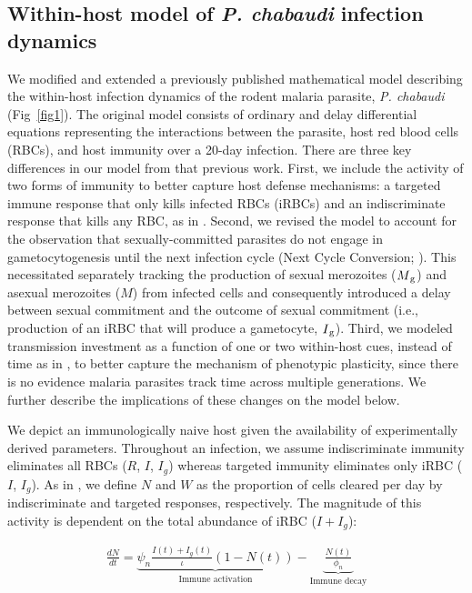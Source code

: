 \documentclass[10pt,letterpaper]{article}
\begin{document}
\subsection*{Within-host model of \emph{P. chabaudi} infection dynamics}
We modified and extended a previously published mathematical model describing the within-host infection dynamics of the rodent malaria parasite, \emph{P. chabaudi} \cite{greischar_predicting_2016} (Fig~\ref{fig1}). The original model consists of ordinary and delay differential equations representing the interactions between the parasite, host red blood cells (RBCs), and host immunity over a 20-day infection. There are three key differences in our model from that previous work. First, we include the activity of two forms of immunity to better capture host defense mechanisms: a targeted immune response that only kills infected RBCs (iRBCs) and an indiscriminate response that kills any RBC, as in \cite{kamiya_uncovering_2020}. Second, we revised the model to account for the observation that sexually-committed parasites do not engage in gametocytogenesis until the next infection cycle (Next Cycle Conversion; \cite{dixon_sex_2008}). This necessitated separately tracking the production of sexual merozoites ($M\textsubscript{g}$) and asexual merozoites ($M$) from infected cells and consequently introduced a delay between sexual commitment and the outcome of sexual commitment (i.e., production of an iRBC that will produce a gametocyte, $I\textsubscript{g}$). Third, we modeled transmission investment as a function of one or two within-host cues, instead of time as in \cite{greischar_predicting_2016}, to better capture the mechanism of phenotypic plasticity, since there is no evidence malaria parasites track time across multiple generations. We further describe the implications of these changes on the model below.\newline

We depict an immunologically naive host given the availability of experimentally derived parameters. Throughout an infection, we assume indiscriminate immunity eliminates all RBCs ($R$, $I$, $I_g$) whereas targeted immunity eliminates only iRBC ($I$, $I_g$). As in \cite{kamiya_uncovering_2020}, we define $N$ and $W$ as the proportion of cells cleared per day by indiscriminate and targeted responses, respectively. The magnitude of this activity is dependent on the total abundance of iRBC ($I+I_g$):

\begin{eqnarray}
\label{eq:scheme13}
    \frac{dN}{dt}=\underbrace{\psi_{n}\frac{I(t)+I_{g}(t)}{\iota}(1-N(t))}_{\text{Immune activation}}-\underbrace{\frac{N(t)}{\phi_{n}}}_{\text{Immune decay}}
\end{eqnarray}
\end{document}
